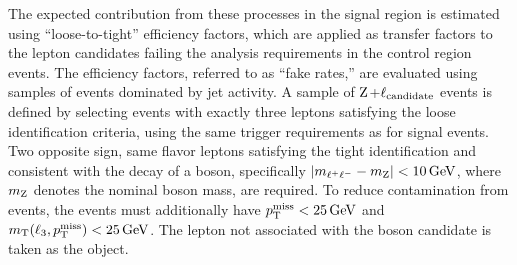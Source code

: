 The expected contribution from these processes in the signal region is estimated
using ``loose-to-tight'' efficiency factors, which are
applied as transfer factors to the lepton candidates failing the analysis requirements 
in the control region events.
The efficiency factors, referred to as ``fake rates,'' are 
evaluated using samples of events dominated by jet activity.
A sample of $\mathrm{Z}$+$\ell_{\rm candidate}$ events is defined by 
selecting events with exactly three leptons satisfying
the loose identification criteria, using the same trigger requirements as
for signal events.
Two opposite sign, same flavor 
leptons satisfying the tight identification and consistent with the decay of
a \PZ boson, specifically $\left|m_{\ell^{+}\ell^{-}} - m_{\mathrm{Z}}\right| < 10\,\text{Ge\hspace{-.08em}V}$,
where $m_{\mathrm{Z}}$ denotes the nominal \PZ boson mass, are required. To reduce contamination
from \WZ events, the events must additionally have $p_{\mathrm{T}}^\text{miss} < 25\,\text{Ge\hspace{-.08em}V}$
and $m_{\rm T}(\ell_{3}, p_{\mathrm{T}}^\text{miss}) < 25\,\text{Ge\hspace{-.08em}V}$. The lepton not associated with the 
\PZ boson candidate is taken as the {\lcand} object. 

